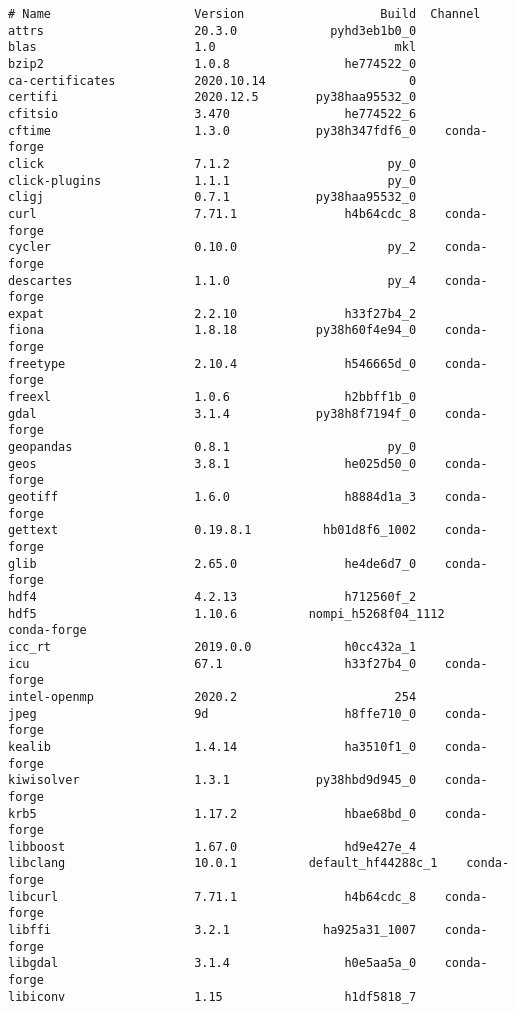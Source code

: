 \begin{Verbatim}
# Name                    Version                   Build  Channel
attrs                     20.3.0             pyhd3eb1b0_0
blas                      1.0                         mkl
bzip2                     1.0.8                he774522_0
ca-certificates           2020.10.14                    0
certifi                   2020.12.5        py38haa95532_0
cfitsio                   3.470                he774522_6
cftime                    1.3.0            py38h347fdf6_0    conda-forge
click                     7.1.2                      py_0
click-plugins             1.1.1                      py_0
cligj                     0.7.1            py38haa95532_0
curl                      7.71.1               h4b64cdc_8    conda-forge
cycler                    0.10.0                     py_2    conda-forge
descartes                 1.1.0                      py_4    conda-forge
expat                     2.2.10               h33f27b4_2
fiona                     1.8.18           py38h60f4e94_0    conda-forge
freetype                  2.10.4               h546665d_0    conda-forge
freexl                    1.0.6                h2bbff1b_0
gdal                      3.1.4            py38h8f7194f_0    conda-forge
geopandas                 0.8.1                      py_0
geos                      3.8.1                he025d50_0    conda-forge
geotiff                   1.6.0                h8884d1a_3    conda-forge
gettext                   0.19.8.1          hb01d8f6_1002    conda-forge
glib                      2.65.0               he4de6d7_0    conda-forge
hdf4                      4.2.13               h712560f_2
hdf5                      1.10.6          nompi_h5268f04_1112    conda-forge
icc_rt                    2019.0.0             h0cc432a_1
icu                       67.1                 h33f27b4_0    conda-forge
intel-openmp              2020.2                      254
jpeg                      9d                   h8ffe710_0    conda-forge
kealib                    1.4.14               ha3510f1_0    conda-forge
kiwisolver                1.3.1            py38hbd9d945_0    conda-forge
krb5                      1.17.2               hbae68bd_0    conda-forge
libboost                  1.67.0               hd9e427e_4
libclang                  10.0.1          default_hf44288c_1    conda-forge
libcurl                   7.71.1               h4b64cdc_8    conda-forge
libffi                    3.2.1             ha925a31_1007    conda-forge
libgdal                   3.1.4                h0e5aa5a_0    conda-forge
libiconv                  1.15                 h1df5818_7

\end{Verbatim}
